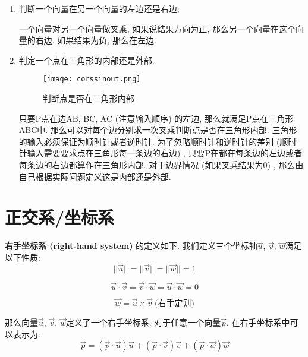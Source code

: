 \begin{enumerate}[label=1)]
	\item 判断一个向量在另一个向量的左边还是右边; 
	
	一个向量对另一个向量做叉乘, 如果说结果方向为正, 那么另一个向量在这个向量的右边. 如果结果为负, 那么在左边. 
	
	\item 判定一个点在三角形的内部还是外部. 
	\begin{figure}[H]
		\centering
		\texttt{[image: corssinout.png]}
		\caption{判断点是否在三角形内部}
		\label{fig:corssio}
	\end{figure}

	只要P点在边AB, BC, AC (注意输入顺序) 的左边, 那么就满足P点在三角形ABC中. 那么可以对每个边分别求一次叉乘判断点是否在三角形内部. 三角形的输入必须保证为顺时针或者逆时针. 为了忽略顺时针和逆时针的差别 (顺时针输入需要要求点在三角形每一条边的右边) , 只要P在都在每条边的左边或者每条边的右边都算作在三角形内部. 对于边界情况 (如果叉乘结果为$0$) , 那么由自己根据实际问题定义这是内部还是外部. 
	
\end{enumerate}

\section{正交系/坐标系}

\textbf{右手坐标系 (right-hand system) }的定义如下. 我们定义三个坐标轴$\overrightarrow{u}$, $\overrightarrow{v}$, $\overrightarrow{w}$满足以下性质: 
\begin{equation}
	||\overrightarrow{u}||=||\overrightarrow{v}||=||\overrightarrow{w}||=1
\end{equation}

\begin{equation}
	\overrightarrow{u}\cdot\overrightarrow{v}=\overrightarrow{v}\cdot\overrightarrow{w}=\overrightarrow{u}\cdot\overrightarrow{w}=0
\end{equation}

\begin{equation}
	\overrightarrow{w}=\overrightarrow{u}\times\overrightarrow{v}\ \text{(右手定则)}
\end{equation}

那么向量$\overrightarrow{u}$, $\overrightarrow{v}$, $\overrightarrow{w}$定义了一个右手坐标系. 对于任意一个向量$\overrightarrow{p}$, 在右手坐标系中可以表示为: 
\begin{equation}
	\overrightarrow{p}=(\overrightarrow{p}\cdot \overrightarrow{u})\overrightarrow{u}+(\overrightarrow{p}\cdot \overrightarrow{v})\overrightarrow{v}+(\overrightarrow{p}\cdot \overrightarrow{w})\overrightarrow{w}
\end{equation}

